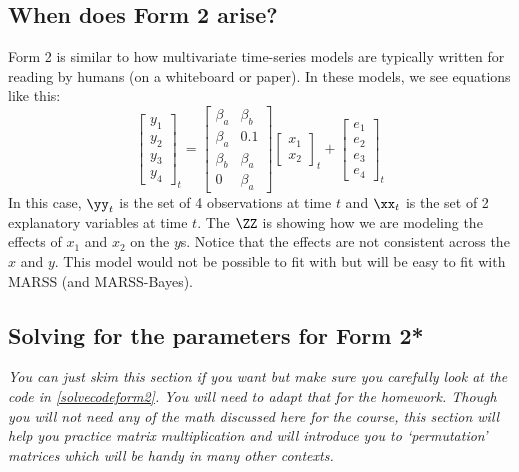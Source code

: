 \subsection{When does Form 2 arise?}
Form 2 is similar to how multivariate time-series models are typically written for reading by humans (on a whiteboard or paper).  In these models, we see equations like this:
\begin{equation}\label{eqn:ss1}
\begin{bmatrix}y_1\\y_2\\y_3\\y_4\end{bmatrix}_t
= 
\begin{bmatrix}
\beta_a&\beta_b\\
\beta_a&0.1\\
\beta_b&\beta_a\\
0&\beta_a
\end{bmatrix}
\begin{bmatrix}x_1 \\ x_2 \end{bmatrix}_t
+
\begin{bmatrix}e_1\\e_2\\e_3\\e_4\end{bmatrix}_t
\end{equation}
In this case, $\yy_t$ is the set of 4 observations at time $t$ and $\xx_t$ is the set of 2 explanatory variables at time $t$. The $\ZZ$ is showing how we are modeling the effects of $x_1$ and $x_2$ on the $y$s.  Notice that the effects are not consistent across the $x$ and $y$.  This model would not be possible to fit with \verb@lm@ but will be easy to fit with MARSS (and MARSS-Bayes).  

\subsection{Solving for the parameters for Form 2*}\label{solveform2}
\textit{You can just skim this section if you want but make sure you carefully look at the code in \ref{solvecodeform2}. You will need to adapt that for the homework.  Though you will not need any of the math discussed here for the course, this section will help you practice matrix multiplication and will introduce you to `permutation' matrices which will be handy in many other contexts. }

